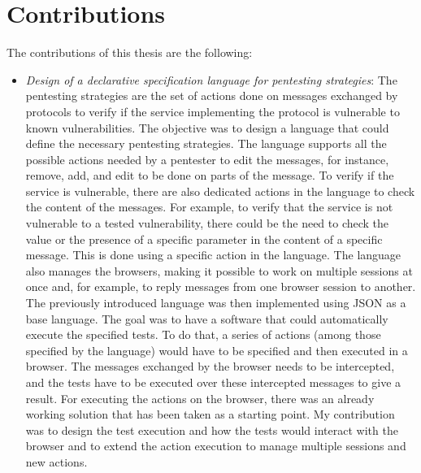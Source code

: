\section{Contributions}
\label{sec:contributions}
The contributions of this thesis are the following:
\begin{itemize}
    \item \textit{Design of a declarative specification language for pentesting strategies}: The pentesting strategies are the set of actions done on messages exchanged by protocols to verify if the service implementing the protocol is vulnerable to known vulnerabilities. The objective was to design a language that could define the necessary pentesting strategies. The language supports all the possible actions needed by a pentester to edit the messages, for instance, remove, add, and edit to be done on parts of the message. To verify if the service is vulnerable, there are also dedicated actions in the language to check the content of the messages. For example, to verify that the service is not vulnerable to a tested vulnerability, there could be the need to check the value or the presence of a specific parameter in the content of a specific message. This is done using a specific action in the language. The language also manages the browsers, making it possible to work on multiple sessions at once and, for example, to reply messages from one browser session to another. The previously introduced language was then implemented using JSON as a base language. The goal was to have a software that could automatically execute the specified tests. To do that, a series of actions (among those specified by the language) would have to be specified and then executed in a browser. The messages exchanged by the browser needs to be intercepted, and the tests have to be executed over these intercepted messages to give a result. For executing the actions on the browser, there was an already working solution \cite{wendy_barreto, claudio_grisenti} that has been taken as a starting point. My contribution was to design the test execution and how the tests would interact with the browser and to extend the action execution to manage multiple sessions and new actions.


\end{itemize}
